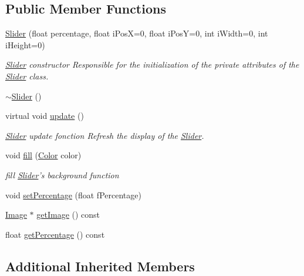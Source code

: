 \subsection*{Public Member Functions}
\begin{DoxyCompactItemize}
\item 
\hyperlink{class_symp_1_1_slider_a4ebcc86ae45c76bf855ec8aa483e44ce}{Slider} (float percentage, float i\-Pos\-X=0, float i\-Pos\-Y=0, int i\-Width=0, int i\-Height=0)
\begin{DoxyCompactList}\small\item\em \hyperlink{class_symp_1_1_slider}{Slider} constructor Responsible for the initialization of the private attributes of the \hyperlink{class_symp_1_1_slider_a4ebcc86ae45c76bf855ec8aa483e44ce}{Slider} class. \end{DoxyCompactList}\item 
\hyperlink{class_symp_1_1_slider_a784b39c5691fff0d3e84e1b3da7177f9}{$\sim$\-Slider} ()
\item 
virtual void \hyperlink{class_symp_1_1_slider_ab010de4ff23eef8a6cc6706e9902209f}{update} ()
\begin{DoxyCompactList}\small\item\em \hyperlink{class_symp_1_1_slider}{Slider} update fonction Refresh the display of the \hyperlink{class_symp_1_1_slider_a4ebcc86ae45c76bf855ec8aa483e44ce}{Slider}. \end{DoxyCompactList}\item 
void \hyperlink{class_symp_1_1_slider_a7e0c531c24bbf7f2dad81fbf98e43601}{fill} (\hyperlink{struct_symp_1_1_color}{Color} color)
\begin{DoxyCompactList}\small\item\em fill \hyperlink{class_symp_1_1_slider}{Slider}'s background function \end{DoxyCompactList}\item 
void \hyperlink{class_symp_1_1_slider_a77c00c6e35179757339f73fd2494502b}{set\-Percentage} (float f\-Percentage)
\item 
\hyperlink{class_symp_1_1_image}{Image} $\ast$ \hyperlink{class_symp_1_1_slider_a0204fb89e780be4ddd4fc41379d9c463}{get\-Image} () const 
\item 
float \hyperlink{class_symp_1_1_slider_a454537b48768334a5c81f84c9af2b006}{get\-Percentage} () const 
\end{DoxyCompactItemize}
\subsection*{Additional Inherited Members}


